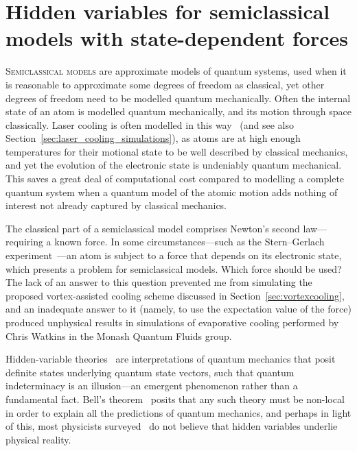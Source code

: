 
\chapter{Hidden variables for semiclassical models with state-dependent forces}\label{chap:hvsc}

\lettrine[lines=3]{S}{emiclassical models} are approximate models of quantum systems, used when it is reasonable to approximate some degrees of freedom as classical, yet other degrees of freedom need to be modelled quantum mechanically. Often the internal state of an atom is modelled quantum mechanically, and its motion through space classically. Laser cooling is often modelled in this way~\cite{mcclelland_atom-optical_1995, wallis_quantum_1995, adams_laser_1997, stenholm_semiclassical_1986, minogin_laser_1987} (and see also Section~\ref{sec:laser_cooling_simulations}), as atoms are at high enough temperatures for their motional state to be well described by classical mechanics, and yet the evolution of the electronic state is undeniably quantum mechanical. This saves a great deal of computational cost compared to modelling a complete quantum system when a quantum model of the atomic motion adds nothing of interest not already captured by classical mechanics. 

The classical part of a semiclassical model comprises Newton's second law---requiring a known force. In some circumstances---such as the Stern--Gerlach experiment~\cite{gerlach_experimentelle_1922}---an atom is subject to a force that depends on its electronic state, which presents a problem for semiclassical models. Which force should be used? The lack of an answer to this question prevented me from simulating the proposed vortex-assisted cooling scheme discussed in Section~\ref{sec:vortexcooling}, and an inadequate answer to it (namely, to use the expectation value of the force) produced unphysical results in simulations of evaporative cooling performed by Chris Watkins in the Monash Quantum Fluids group.

Hidden-variable theories~\cite{GENOVESE2005319, PhysRevA.71.032325} are interpretations of quantum mechanics that posit definite states underlying quantum state vectors, such that quantum indeterminacy is an illusion---an emergent phenomenon rather than a fundamental fact. Bell's theorem~\cite{bell_einstein_1964} posits that any such theory must be non-local in order to explain all the predictions of quantum mechanics, and perhaps in light of this, most physicists surveyed~\cite{schlosshauer_snapshot_2013} do not believe that hidden variables underlie physical reality.

